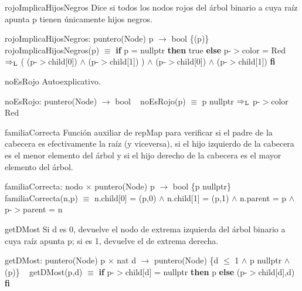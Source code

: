 \begin{DoxyParagraph}{rojo\+Implica\+Hijos\+Negros}
Dice si todos los nodos rojos del árbol binario a cuya raíz apunta p tienen únicamente hijos negros.

rojo\+Implica\+Hijos\+Negros\+: puntero(\+Node) p $\to$ bool \{(p)\} ~\newline
rojo\+Implica\+Hijos\+Negros(p) $\equiv$ {\bfseries if} p = nullptr {\bfseries then} true {\bfseries else} p-\/$>$color = Red $\Rightarrow_{\rm L}$ ( (p-\/$>$child\mbox{[}0\mbox{]}) $\land$ (p-\/$>$child\mbox{[}1\mbox{]}) ) $\land$ (p-\/$>$child\mbox{[}0\mbox{]}) $\land$ (p-\/$>$child\mbox{[}1\mbox{]}) {\bfseries fi} 


\end{DoxyParagraph}
\begin{DoxyParagraph}{no\+Es\+Rojo}
Autoexplicativo.

no\+Es\+Rojo\+: puntero(\+Node) $\to$ bool ~\newline
no\+Es\+Rojo(p) $\equiv$ p  nullptr $\Rightarrow_{\rm L}$ p-\/$>$color  Red


\end{DoxyParagraph}
\begin{DoxyParagraph}{familia\+Correcta}
Función auxiliar de rep\+Map para verificar si el padre de la cabecera es efectivamente la raíz (y viceversa), si el hijo izquierdo de la cabecera es el menor elemento del árbol y si el hijo derecho de la cabecera es el mayor elemento del árbol.

familia\+Correcta\+: nodo $\times$ puntero(\+Node) p $\to$ bool \{p  nullptr\} ~\newline
familia\+Correcta(n,p) $\equiv$ n.\+child\mbox{[}0\mbox{]} = (p,0) $\land$ n.\+child\mbox{[}1\mbox{]} = (p,1) $\land$ n.\+parent = p $\land$ p-\/$>$parent = n


\end{DoxyParagraph}
\begin{DoxyParagraph}{get\+D\+Most}
Si d es 0, devuelve el nodo de extrema izquierda del árbol binario a cuya raíz apunta p; si es 1, devuelve el de extrema derecha.

get\+D\+Most\+: puntero(\+Node) p $\times$ nat d $\to$ puntero(\+Node) \{d $\leq$ 1 $\land$ p  nullptr $\land$ (p)\} ~\newline
get\+D\+Most(p,d) $\equiv$ {\bfseries if} p-\/$>$child\mbox{[}d\mbox{]} = nullptr {\bfseries then} p {\bfseries else} (p-\/$>$child\mbox{[}d\mbox{]},d) {\bfseries fi} 


\end{DoxyParagraph}
